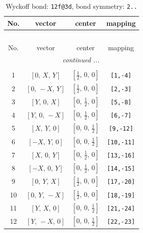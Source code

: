 \documentclass[fleqn,8pt]{jsarticle}
\begin{document}
\renewcommand{\arraystretch}{1.2}
\begin{longtable}{cccc}
\caption{Wyckoff bond: {\tt 12f@3d}, bond symmetry: {\tt 2..}}
 \\
 \hline \hline
No. & vector & center & mapping \\ \hline \endfirsthead

\multicolumn{3}{l}{\tablename\ \thetable{}} \\
 \hline \hline
No. & vector & center & mapping \\ \hline \endhead

 \hline \hline
\multicolumn{3}{r}{\footnotesize\it continued ...} \\ \endfoot

 \hline \hline
\multicolumn{3}{r}{} \\ \endlastfoot

1 & $\left[ 0,\, X,\, Y \right]$ & $\left[ \frac{1}{2},\, 0,\, 0 \right]$ & {\tt [1,-4]} \\ \hline
2 & $\left[ 0,\, - X,\, Y \right]$ & $\left[ \frac{1}{2},\, 0,\, 0 \right]$ & {\tt [2,-3]} \\ \hline
3 & $\left[ Y,\, 0,\, X \right]$ & $\left[ 0,\, \frac{1}{2},\, 0 \right]$ & {\tt [5,-8]} \\ \hline
4 & $\left[ Y,\, 0,\, - X \right]$ & $\left[ 0,\, \frac{1}{2},\, 0 \right]$ & {\tt [6,-7]} \\ \hline
5 & $\left[ X,\, Y,\, 0 \right]$ & $\left[ 0,\, 0,\, \frac{1}{2} \right]$ & {\tt [9,-12]} \\ \hline
6 & $\left[ - X,\, Y,\, 0 \right]$ & $\left[ 0,\, 0,\, \frac{1}{2} \right]$ & {\tt [10,-11]} \\ \hline
7 & $\left[ X,\, 0,\, Y \right]$ & $\left[ 0,\, \frac{1}{2},\, 0 \right]$ & {\tt [13,-16]} \\ \hline
8 & $\left[ - X,\, 0,\, Y \right]$ & $\left[ 0,\, \frac{1}{2},\, 0 \right]$ & {\tt [14,-15]} \\ \hline
9 & $\left[ 0,\, Y,\, X \right]$ & $\left[ \frac{1}{2},\, 0,\, 0 \right]$ & {\tt [17,-20]} \\ \hline
10 & $\left[ 0,\, Y,\, - X \right]$ & $\left[ \frac{1}{2},\, 0,\, 0 \right]$ & {\tt [18,-19]} \\ \hline
11 & $\left[ Y,\, X,\, 0 \right]$ & $\left[ 0,\, 0,\, \frac{1}{2} \right]$ & {\tt [21,-24]} \\ \hline
12 & $\left[ Y,\, - X,\, 0 \right]$ & $\left[ 0,\, 0,\, \frac{1}{2} \right]$ & {\tt [22,-23]} \\
\end{longtable}
\end{document}
